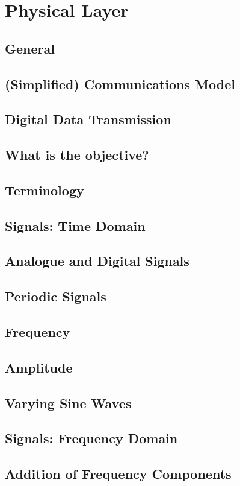 \documentclass[11pt]{article}
\begin{document}
\section{Physical Layer}
\subsection{General}
\subsection{(Simplified) Communications Model}
\subsection{Digital Data Transmission}
\subsection{What is the objective?}
\subsection{Terminology}
\subsection{Signals: Time Domain}
\subsection{Analogue and Digital Signals}
\subsection{Periodic Signals}
\subsection{Frequency}
\subsection{Amplitude}
\subsection{Varying Sine Waves}
\subsection{Signals: Frequency Domain}
\subsection{Addition of Frequency Components}
\end{document}
